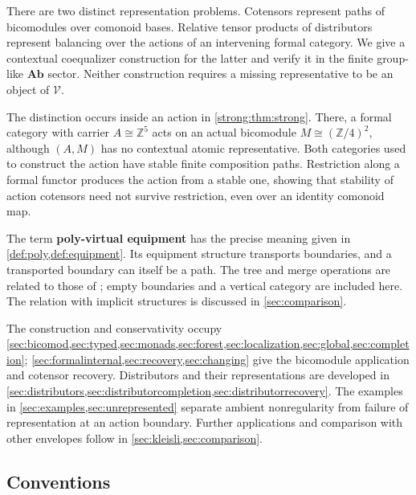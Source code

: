 \documentclass[11pt,reqno]{amsart}
\theoremstyle{plain}
\theoremstyle{definition}
\theoremstyle{remark}
\numberwithin{equation}{section}
\newcommand{\V}{\mathcal V}
\newcommand{\Ab}{\mathbf{Ab}}
\newcommand{\Z}{\mathbb Z}
\begin{document}
There are two distinct representation problems. Cotensors represent
paths of bicomodules over comonoid bases. Relative tensor products of
distributors represent balancing over the actions of an intervening
formal category. We give a contextual coequalizer construction for the
latter and verify it in the finite group-like $\Ab$ sector. Neither
construction requires a missing representative to be an object of $\V$.

The distinction occurs inside an action in \cref{strong:thm:strong}.
There, a formal category with carrier $A\cong\Z^5$ acts on an actual
bicomodule $M\cong(\Z/4)^2$, although $(A,M)$ has no contextual atomic
representative. Both categories used to construct the action have stable
finite composition paths. Restriction along a formal functor produces
the action from a stable one, showing that stability of action cotensors
need not survive restriction, even over an identity comonoid map.

The term \textbf{poly-virtual equipment} has the precise meaning given in
\cref{def:poly,def:equipment}. Its equipment structure transports
boundaries, and a transported boundary can itself be a path. The tree and
merge operations are related to those of \cite{Hadzihasanovic2019}; empty
boundaries and a vertical category are included here. The relation with
implicit structures is discussed in \cref{sec:comparison}.

The construction and conservativity occupy
\cref{sec:bicomod,sec:typed,sec:monads,sec:forest,sec:localization,sec:global,sec:completion};
\cref{sec:formalinternal,sec:recovery,sec:changing} give the bicomodule
application and cotensor recovery. Distributors and their representations
are developed in
\cref{sec:distributors,sec:distributorcompletion,sec:distributorrecovery}.
The examples in \cref{sec:examples,sec:unrepresented} separate ambient
nonregularity from failure of representation at an action boundary.
Further applications and comparison with other envelopes follow in
\cref{sec:kleisli,sec:comparison}.

\subsection*{Conventions}
\end{document}
